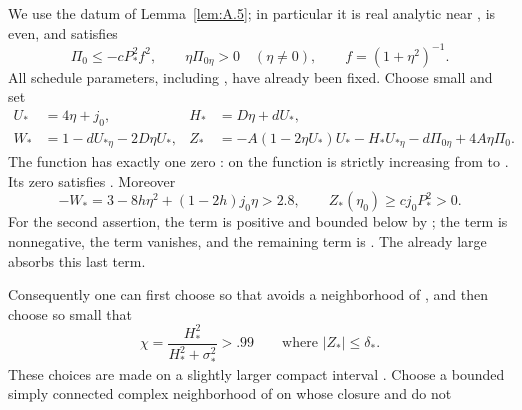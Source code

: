 We use the datum  of Lemma~\ref{lem:A.5}; in particular it is real analytic near
, is even, and satisfies
\[
  \Pi_0\leq-cP_*^2f^2,
  \qquad \eta\Pi_{0\eta}>0\quad(\eta\neq 0),
  \qquad f=(1+\eta^2)^{-1}.
\]
All schedule parameters, including , have already been fixed. Choose
 small and set
\begin{equation}
\begin{aligned}
  U_*&=4\eta+j_0, & H_*&=D\eta+dU_*,\\
  W_*&=1-dU_{*\eta}-2D\eta U_*,
  & Z_*&=-A(1-2\eta U_*)U_*-H_*U_{*\eta}-d\Pi_{0\eta}+4A\eta\Pi_0.
\end{aligned}
\tag{B.1}\label{eq:B.1}
\end{equation}
The function  has exactly one zero : on
 the function  is strictly increasing from
 to . Its zero satisfies
. Moreover
\[
  -W_*=3-8h\eta^2+(1-2h)j_0\eta>2.8,
  \qquad Z_*(\eta_0)\geq cj_0P_*^2>0.
\]
For the second assertion, the term  is positive and bounded below by
; the term  is nonnegative, the
 term vanishes, and the remaining term is . The already large
 absorbs this last term.

Consequently one can first choose  so that
 avoids a neighborhood of , and then choose
 so small that
\begin{equation}
  \chi=\frac{H_*^2}{H_*^2+\sigma_*^2}>.99
  \qquad\text{where }|Z_*|\leq\delta_*.
  \tag{B.2}\label{eq:B.2}
\end{equation}
These choices are made on a slightly larger compact interval . Choose a bounded simply
connected complex neighborhood  of  on whose closure
 and  do not
